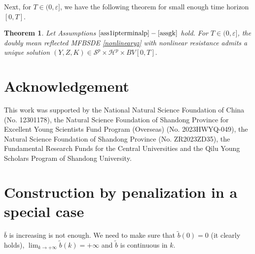 \documentclass[10pt]{article}%
\numberwithin{equation}{section}
\newtheorem{theorem}{Theorem}[section]
\begin{document}
Next, for $T\in(0,\varepsilon]$, we have the following theorem for small enough time horizon $[0,T]$.
\begin{theorem}\label{th3-1}
Let Assumptions $\ref{ass1ipterminalp}-\ref{assgk}$ hold. For $T\in(0,\varepsilon]$, the doubly mean reflected MFBSDE \eqref{nonlinearyz} with nonlinear resistance admits a unique solution $(Y,Z,K)\in \mathcal{S}^p \times \mathcal{H}^{p} \times BV[0,T].$   
\end{theorem}
\fi

\section*{Acknowledgement}
    This work was supported  by the National Natural Science Foundation of China (No. 12301178), the Natural Science Foundation of Shandong Province for Excellent Young Scientists Fund Program (Overseas) (No. 2023HWYQ-049),  the Natural Science Foundation of Shandong Province (No. ZR2023ZD35),  the Fundamental Research Funds for the Central Universities and  the Qilu Young Scholars Program of Shandong University. 

\iffalse
\renewcommand\thesection{Appendix A}
\section{Construction by penalization in a special case}\label{append:A}
\renewcommand\thesection{A}

\iffalse
{\color{red}$\bar{b}$ is increasing is not enough. We need to make sure that $\widetilde{b}(0)=0$ (it clearly holds), $\lim_{k\rightarrow+\infty}\widetilde{b}(k)=+\infty$ and $\widetilde{b}$ is continuous in $k$.}
\end{document}
